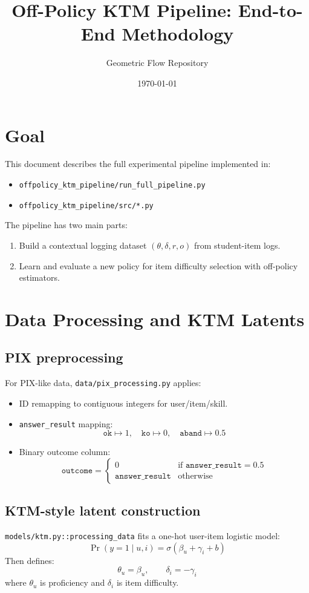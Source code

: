\documentclass[11pt]{article}
\title{Off-Policy KTM Pipeline: End-to-End Methodology}
\author{Geometric Flow Repository}
\date{\today}
\begin{document}
\maketitle

\section{Goal}
This document describes the full experimental pipeline implemented in:
\begin{itemize}
  \item \texttt{offpolicy\_ktm\_pipeline/run\_full\_pipeline.py}
  \item \texttt{offpolicy\_ktm\_pipeline/src/*.py}
\end{itemize}

The pipeline has two main parts:
\begin{enumerate}
  \item Build a contextual logging dataset $(\theta,\delta,r,o)$ from student-item logs.
  \item Learn and evaluate a new policy for item difficulty selection with off-policy estimators.
\end{enumerate}

\section{Data Processing and KTM Latents}
\subsection{PIX preprocessing}
For PIX-like data, \texttt{data/pix\_processing.py} applies:
\begin{itemize}
  \item ID remapping to contiguous integers for user/item/skill.
  \item \texttt{answer\_result} mapping:
  \[
  \texttt{ok}\mapsto 1,\quad \texttt{ko}\mapsto 0,\quad \texttt{aband}\mapsto 0.5
  \]
  \item Binary outcome column:
  \[
  \texttt{outcome} =
  \begin{cases}
  0 & \text{if } \texttt{answer\_result}=0.5\\
  \texttt{answer\_result} & \text{otherwise}
  \end{cases}
  \]
\end{itemize}

\subsection{KTM-style latent construction}
\texttt{models/ktm.py::processing\_data} fits a one-hot user-item logistic model:
\[
\Pr(y=1\mid u,i)=\sigma\!\left(\beta_u+\gamma_i+b\right)
\]
Then defines:
\[
\theta_u=\beta_u,\qquad \delta_i=-\gamma_i
\]
where $\theta_u$ is proficiency and $\delta_i$ is item difficulty.
\end{document}
